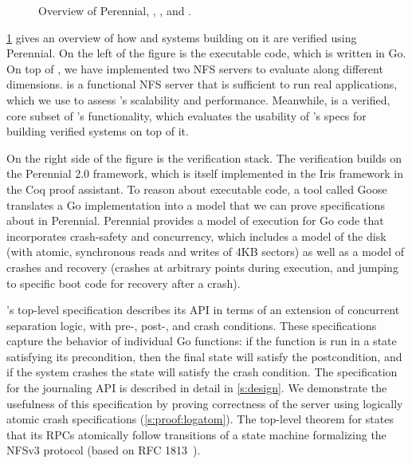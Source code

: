 
\begin{figure}

\caption{Overview of Perennial, \txn, \simplenfs, and \gnfs.}
\label{fig:overview}
\end{figure}

\cref{fig:overview} gives an overview of how \txn and systems
building on it are verified using Perennial.
On the left of the figure is the executable code, which is written
in Go. On top of \txn, we have implemented two NFS servers to evaluate \txn
along different dimensions. \gnfs is a functional NFS server that is sufficient
to run real applications, which we use to assess \txn's scalability and
performance. Meanwhile, \simplenfs is a verified, core subset of \gnfs's
functionality, which evaluates the usability of \txn's specs for building
verified systems on top of it.

On the right side of the figure is the verification stack. The verification
builds on the Perennial 2.0 framework, which is itself implemented in the Iris
framework in the Coq proof assistant. To reason about executable code, a tool
called Goose translates a Go implementation into a model that we can prove
specifications about in Perennial. Perennial provides a model of execution for
Go code that incorporates crash-safety and concurrency, which
includes a model of the disk (with atomic, synchronous reads and writes of 4KB
sectors) as well as a model of crashes and recovery (crashes at arbitrary points
during execution, and jumping to specific boot code for recovery after a crash).

\txn's top-level specification describes its API in terms of an extension of
concurrent separation logic, with pre-, post-, and crash conditions. These
specifications capture the behavior of individual Go functions: if the function
is run in a state satisfying its precondition, then the final state will satisfy
the postcondition, and if the system crashes the state will satisfy the crash
condition. The specification for the journaling API is described in detail in \cref{s:design}. We
demonstrate the usefulness of this specification by proving correctness of the \simplenfs
server using logically atomic crash specifications (\cref{s:proof:logatom}). %
The top-level theorem for \simplenfs states that its RPCs
atomically follow transitions of a state machine formalizing the NFSv3 protocol (based on RFC
1813~\cite{RFC:1813}).

